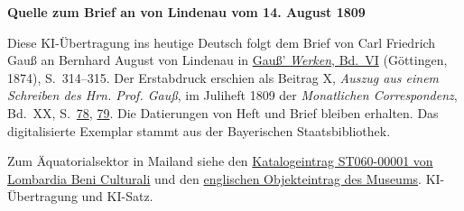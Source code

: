 \clearpage\thispagestyle{empty}
\begin{center}\textbf{Quelle zum Brief an von Lindenau vom 14. August 1809}\end{center}
\noindent Diese KI-Übertragung ins heutige Deutsch folgt dem Brief von Carl Friedrich Gauß an Bernhard August von Lindenau in \href{https://gdz.sub.uni-goettingen.de/id/PPN236007467}{Gauß’ \textit{Werken}, Bd.~VI} (Göttingen, 1874), S.~314--315. Der Erstabdruck erschien als Beitrag X, \textit{Auszug aus einem Schreiben des Hrn. Prof. Gauß}, im Juliheft 1809 der \textit{Monatlichen Correspondenz}, Bd.~XX, S.~\href{https://api.digitale-sammlungen.de/iiif/image/v2/bsb10538610_00084/full/1600,/0/default.jpg}{78}, \href{https://api.digitale-sammlungen.de/iiif/image/v2/bsb10538610_00085/full/1600,/0/default.jpg}{79}. Die Datierungen von Heft und Brief bleiben erhalten. Das digitalisierte Exemplar stammt aus der Bayerischen Staatsbibliothek.
\par\smallskip\noindent Zum Äquatorialsektor in Mailand siehe den \href{https://www.lombardiabeniculturali.it/scienza-tecnologia/schede/ST060-00001/}{Katalogeintrag ST060-00001 von Lombardia Beni Culturali} und den \href{https://artsandculture.google.com/asset/equatorial-sector/OwGZAfaAaOv35g}{englischen Objekteintrag des Museums}. KI-Übertragung und KI-Satz.
\clearpage
